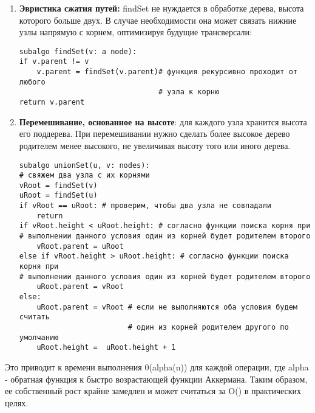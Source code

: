 \vspace{\baselineskip}
\begin{enumerate}
    \item \textbf{Эвристика сжатия путей:} findSet не нуждается в обработке дерева, высота которого больше двух. В случае необходимости она может связать нижние узлы напрямую с корнем, оптимизируя будущие трансверсали: 
	
	\vspace{\baselineskip}
	\begin{tcolorbox}
	\begin{verbatim}
subalgo findSet(v: a node):
if v.parent != v
	v.parent = findSet(v.parent)# функция рекурсивно проходит от любого 
								# узла к корню
return v.parent
    \end{verbatim}
    \end{tcolorbox}
    
    \item \textbf{Перемешивание, основанное на высоте}: для каждого узла хранится высота его поддерева. При перемешивании нужно сделать более высокое дерево родителем менее высокого, не увеличивая высоту того или иного дерева.
    
    \vspace{\baselineskip}
    \begin{tcolorbox}
    \begin{verbatim}
subalgo unionSet(u, v: nodes):
# свяжем два узла с их корнями
vRoot = findSet(v)
uRoot = findSet(u)
if vRoot == uRoot: # проверим, чтобы два узла не совпадали
	return
if vRoot.height < uRoot.height: # согласно функции поиска корня при 
# выполнении данного условия один из корней будет родителем второго
	vRoot.parent = uRoot
else if vRoot.height > uRoot.height: # согласно функции поиска корня при 
# выполнении данного условия один из корней будет родителем второго
	uRoot.parent = vRoot
else:
	uRoot.parent = vRoot # если не выполняются оба условия будем считать 
						 # один из корней родителем другого по умолчанию
	uRoot.height =  uRoot.height + 1
    \end{verbatim}
    \end{tcolorbox} 
    
\end{enumerate}

\vspace{\baselineskip}
Это приводит к времени выполнения 0(alpha(n)) для каждой операции, где alpha - обратная функция к быстро возрастающей функции Аккермана. Таким образом, ее собственный рост крайне замедлен и может считаться за O()  в практических целях.

